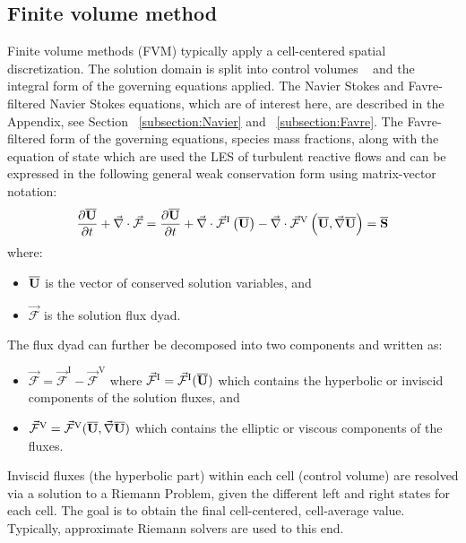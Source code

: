 \subsection{Finite volume method}
Finite volume methods (FVM) typically apply a cell-centered spatial discretization. The solution domain  is split into control volumes ~\cite{Toro:1997} and the integral form of the governing equations applied. The Navier Stokes and Favre-filtered Navier Stokes equations, which are of interest here, are described in the Appendix, see Section ~\ref{subsection:Navier} and ~\ref{subsection:Favre}. The Favre-filtered form of the governing equations, species mass fractions, along with the equation of state which are used the LES of turbulent reactive flows and can be expressed in the following general weak conservation form using matrix-vector notation: ~\cite{Neto:2014}
\begin{equation}
\label{eq:weak.form}
\frac{\partial \overline{\mathbf{U}}}{\partial t} 
+ \vec{\nabla} \cdot \vec{\mathcal{F}} =
\frac{\partial \overline{\mathbf{U}}}{\partial t} + 
\vec{\nabla} \cdot \vec{\mathcal{F}}^{\mathrm{I}} \left( \overline{\mathbf{U}} \right) - 
\vec{\nabla} \cdot \vec{\mathcal{F}}^{\mathrm{V}} 
\left( \overline{\mathbf{U}}, \vec{\nabla} \overline{\mathbf{U}} \right) = 
\overline{\mathbf{S}}
\end{equation}
where:
\begin{itemize}
 \item $\overline{\mathbf{U}}$ is the vector of conserved solution variables, and 
 \item $\vec{\mathcal{F}}$ is the solution flux dyad.
\end{itemize}  
 
The flux dyad can further be decomposed into two components and written as:
\begin{itemize}
\item $\vec{\mathcal{F}} =  \vec{\mathcal{F}}^{\mathrm I} - \vec{\mathcal{F}}^{\mathrm{V}}$ where $\vec{\mathcal{F}}^{\mathrm I} = \vec{\mathcal{F}}^{\mathrm I}(\overline{\mathbf{U}})$ which contains the hyperbolic or inviscid components of the solution fluxes, and 
\item $\vec{\mathcal{F}}^{\mathrm{V}} =  \vec{\mathcal{F}}^{\mathrm{V}}(\overline{\mathbf{U}}, \vec{\nabla} \overline{\mathbf{U}})$ which contains the elliptic or viscous components of the fluxes.
\end{itemize}

Inviscid fluxes (the hyperbolic part) within each cell (control volume) are resolved via a solution to a Riemann Problem, given the different left and right states for each cell. The goal is to obtain the final cell-centered, cell-average value. Typically, approximate Riemann solvers are used to this end.

